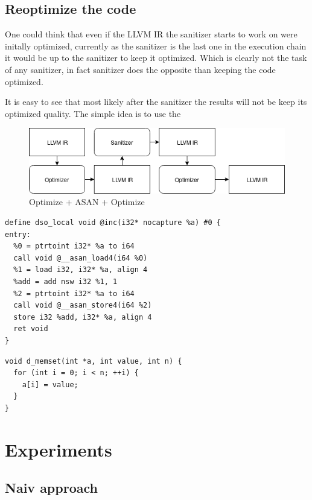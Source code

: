 \documentclass[letterpaper, 10 pt]{llncs}
\begin{document}
\subsection{Reoptimize the code}

One could think that even if the LLVM IR the sanitizer starts to work on were initally optimized, currently as the sanitizer is the last one in the execution chain it would be up to the sanitizer to keep it optimized. Which is clearly not the task of any sanitizer, in fact sanitizer does the opposite than keeping the code optimized.

It is easy to see that most likely after the sanitizer the results will not be keep its optimized quality. The simple idea is to use the 


\begin{figure}[H]
\centering
\includegraphics[scale=0.5]{clang-opt-asan-opt.png}
\caption{Optimize + ASAN + Optimize}
\label{fig:opt-asan-opt}
\end{figure}






\begin{verbatim}
define dso_local void @inc(i32* nocapture %a) #0 {
entry:
  %0 = ptrtoint i32* %a to i64
  call void @__asan_load4(i64 %0)
  %1 = load i32, i32* %a, align 4
  %add = add nsw i32 %1, 1
  %2 = ptrtoint i32* %a to i64
  call void @__asan_store4(i64 %2)
  store i32 %add, i32* %a, align 4
  ret void
}
\end{verbatim}

\begin{verbatim}
void d_memset(int *a, int value, int n) {
  for (int i = 0; i < n; ++i) {
    a[i] = value;
  }
}
\end{verbatim}


\section{Experiments}

\subsection{Naiv approach}
\end{document}
